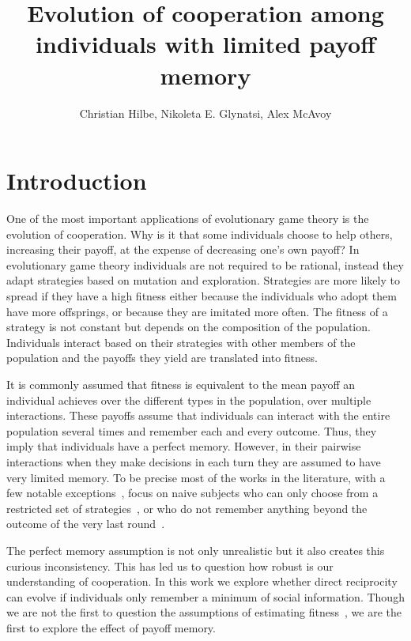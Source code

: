 \documentclass[11pt]{article}
\title{
\bf  \sffamily \LARGE Evolution of cooperation among individuals with limited payoff memory\\}
\date{}
\author{Christian Hilbe, Nikoleta E. Glynatsi, Alex McAvoy}
\theoremstyle{plainCl1}
\theoremstyle{plainCl2}
\begin{document}
\maketitle

\begin{abstract}

\end{abstract}

\section{Introduction}

One of the most important applications of evolutionary game theory is the
evolution of cooperation. Why is it that some individuals choose to help others,
increasing their payoff, at the expense of decreasing one's own payoff? In
evolutionary game theory individuals are not required to be rational, instead
they adapt strategies based on mutation and exploration. Strategies are more
likely to spread if they have a high fitness either because the individuals who
adopt them have more offsprings, or because they are imitated more often. The
fitness of a strategy is not constant but depends on the composition of the
population. Individuals interact based on their strategies with other
members of the population and the payoffs they yield are translated into
fitness.

It is commonly assumed that fitness is equivalent to the mean payoff an
individual achieves over the different types in the population, over multiple
interactions. These payoffs assume that individuals can interact with the entire
population several times and remember each and every outcome. Thus, they imply
that individuals have a perfect memory.
However, in their pairwise interactions when they make decisions in each turn
they are assumed to have very limited memory. To be precise most of
the works in the literature,  with a few notable exceptions~\cite{Hauert1997,
Stewart2016}, focus on naive subjects who can only choose from a restricted set
of strategies~\cite{Nowak1992tit}, or who do not remember anything beyond the
outcome of the very last round~\cite{Baek2016}.

The perfect memory assumption is not only unrealistic but it also creates this
curious inconsistency. This has led us to question how robust is our
understanding of cooperation. In this work we explore whether direct
reciprocity can evolve if individuals only remember a minimum of social
information. Though we are not the first to question the assumptions of
estimating fitness~\cite{Roca2006}, we are the first to explore the effect
of payoff memory.
\end{document}
